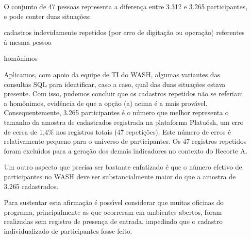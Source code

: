 \documentclass[
12pt,		%
openright,	%
twoside,  %
a4paper,			%
chapter=TITLE,		%
english,			%
french,				%
spanish,			%
brazil				%
]{USPSC-classe/USPSC}
\begin{document}
O conjunto de 47 pessoas representa a diferen\c{c}a entre 3.312 e 3.265 participantes, e pode conter duas situa\c{c}\~oes:











\begin{alineas}
\item cadastros indevidamente repetidos (por erro de digita\c{c}\~ao ou opera\c{c}\~ao) referentes \`a mesma pessoa
\item hom\^onimos
\end{alineas}

Aplicamos, com apoio da equipe de TI do WASH, algumas variantes das consultas SQL para identificar, caso a caso, qual das duas situa\c{c}\~oes estava presente. Com isso, pudemos concluir que os cadastros repetidos n\~ao se referiam a hom\^onimos, evid\^encia de que a op\c{c}\~ao (a) acima \'e a mais prov\'avel. Consequentemente, 3.265 participantes \'e o n\'umero que melhor representa o tamanho da amostra de cadastrados registrada na plataforma Platu\'osh, um erro de cerca de 1,4\% nos registros totais (47 repeti\c{c}\~oes). Este n\'umero de erros \'e relativamente pequeno para o universo de participantes. Os 47 registros repetidos foram exclu\'{\i}dos para a gera\c{c}\~ao dos demais indicadores no contexto do Recorte A.











\noindent\begin{center}\mbox{\centering{}}\end{center}


Um outro aspecto que precisa ser bastante enfatizado \'e que o n\'umero efetivo de participantes no WASH deve ser substancialmente maior do que a amostra de 3.265 cadastrados.










Para sustentar esta afirma\c{c}\~ao \'e poss\'{\i}vel considerar que muitas oficinas do programa, principalmente as que ocorreram em ambientes abertos, foram realizadas sem registro de presen\c{c}a  de entrada, impedindo que o cadastro individualizado de participantes fosse feito.
\end{document}
